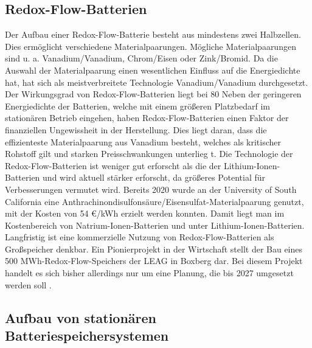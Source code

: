 \subsection{Redox-Flow-Batterien}

Der Aufbau einer Redox-Flow-Batterie besteht aus mindestens zwei Halbzellen. Dies ermöglicht verschiedene Materialpaarungen. Mögliche Materialpaarungen sind u. a. Vanadium/Vanadium, Chrom/Eisen oder Zink/Bromid. Da die Auswahl der Materialpaarung einen wesentlichen Einfluss auf die Energiedichte hat, hat sich als meistverbreitete Technologie Vanadium/Vanadium durchgesetzt. 
Der Wirkungsgrad von Redox-Flow-Batterien liegt bei 80 %
Neben der geringeren Energiedichte der Batterien, welche mit einem größeren Platzbedarf im stationären Betrieb eingehen, haben Redox-Flow-Batterien einen Faktor der finanziellen Ungewissheit in der Herstellung. Dies liegt daran, dass die effizienteste Materialpaarung aus Vanadium besteht, welches als kritischer Rohstoff gilt und starken Preisschwankungen unterlieg t.
Die Technologie der Redox-Flow-Batterien ist weniger gut erforscht als die der Lithium-Ionen-Batterien und wird aktuell stärker erforscht, da größeres Potential für Verbesserungen vermutet wird. Bereits 2020 wurde an der University of South California eine Anthrachinondisulfonsäure/Eisensulfat-Materialpaarung genutzt, mit der Kosten von 54 €/kWh  erzielt werden konnten. Damit liegt man im Kostenbereich von Natrium-Ionen-Batterien und unter Lithium-Ionen-Batterien. Langfristig ist eine kommerzielle Nutzung von Redox-Flow-Batterien als Großspeicher denkbar. Ein Pionierprojekt in der Wirtschaft stellt der Bau eines 500 MWh-Redox-Flow-Speichers der LEAG in Boxberg dar. Bei diesem Projekt handelt es sich bisher allerdings nur um eine Planung, die bis 2027 umgesetzt werden soll .

\subsection{Aufbau von stationären Batteriespeichersystemen}

